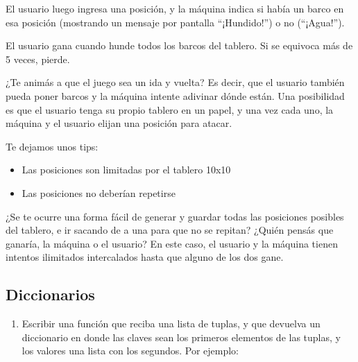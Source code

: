 \documentclass[
  letterpaper,
  DIV=11,
  numbers=noendperiod]{scrreprt}
\providecommand{\tightlist}{%
  \setlength{\itemsep}{0pt}\setlength{\parskip}{0pt}}\usepackage{longtable,booktabs,array}
\begin{document}
\begin{enumerate}
  El usuario luego ingresa una posición, y la máquina indica si había un
  barco en esa posición (mostrando un mensaje por pantalla
  ``¡Hundido!'') o no (``¡Agua!'').

  El usuario gana cuando hunde todos los barcos del tablero. Si se
  equivoca más de 5 veces, pierde.

  \begin{tcolorbox}[enhanced jigsaw, opacityback=0, coltitle=black, toptitle=1mm, colframe=quarto-callout-important-color-frame, leftrule=.75mm, colback=white, opacitybacktitle=0.6, toprule=.15mm, breakable, bottomrule=.15mm, rightrule=.15mm, bottomtitle=1mm, titlerule=0mm, title=\textcolor{quarto-callout-important-color}{\faExclamation}\hspace{0.5em}{Batalla Naval: Modo Supervivencia}, colbacktitle=quarto-callout-important-color!10!white, left=2mm, arc=.35mm]

  ¿Te animás a que el juego sea un ida y vuelta? Es decir, que el
  usuario también pueda poner barcos y la máquina intente adivinar dónde
  están. Una posibilidad es que el usuario tenga su propio tablero en un
  papel, y una vez cada uno, la máquina y el usuario elijan una posición
  para atacar.

  Te dejamos unos tips:

  \begin{itemize}
  \tightlist
  \item
    Las posiciones son limitadas por el tablero 10x10
  \item
    Las posiciones no deberían repetirse
  \end{itemize}

  ¿Se te ocurre una forma fácil de generar y guardar todas las
  posiciones posibles del tablero, e ir sacando de a una para que no se
  repitan? ¿Quién pensás que ganaría, la máquina o el usuario? En este
  caso, el usuario y la máquina tienen intentos ilimitados intercalados
  hasta que alguno de los dos gane.

  \end{tcolorbox}
\end{enumerate}

\subsection*{Diccionarios}\label{diccionarios-1}

\begin{enumerate}
\def\labelenumi{\arabic{enumi}.}
\tightlist
\item
  Escribir una función que reciba una lista de tuplas, y que devuelva un
  diccionario en donde las claves sean los primeros elementos de las
  tuplas, y los valores una lista con los segundos. Por ejemplo:
\end{enumerate}
\end{document}
